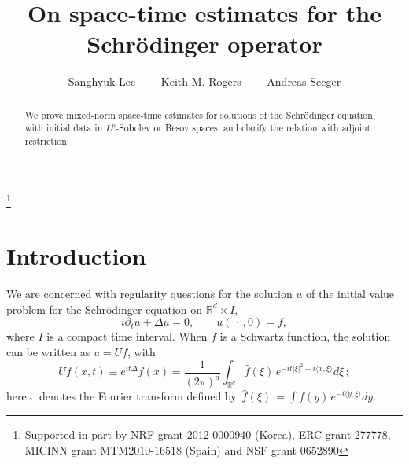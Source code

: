 \documentclass[11pt]{amsart}
\theoremstyle{definition}
\numberwithin{theorem}{section}
\numberwithin{definition}{section}
\numberwithin{equation}{section}
\def\inn#1#2{\langle#1,#2\rangle}
\def\inn#1#2{\langle#1,#2\rangle}
\def\bbR{{\mathbb {R}}}
\begin{document}
\newcommand{\w}{\widehat{f}}
\newcommand{\B}{\mathbb{B}}







\title[Space-time estimates for the Schr\"odinger operator]{On space-time
estimates for the Schr\"odinger operator}
\thanks{Supported in part by NRF grant 2012-0000940 (Korea),
ERC grant 277778, MICINN grant MTM2010-16518 (Spain) and NSF grant
0652890}

\author{Sanghyuk Lee \ \ \ \ Keith M. Rogers \ \ \ \ Andreas Seeger}



\address{Sanghyuk Lee\\ School of Mathematical Sciences,
Seoul National University, Seoul 151-742, Korea}

\address{Keith Rogers \\
Instituto de Ciencias Matematicas
CSIC-UAM-UC3M-UCM\\
28049 Madrid, Spain} 

\address{Andreas Seeger \\ Department of Mathematics \\ University of Wisconsin\\
480 Lincoln Drive\\
Madison, WI, 53706, USA} 



\begin{abstract}
We prove mixed-norm space-time estimates for solutions of the
Schr\"odinger equation, with initial data in $L^p$-Sobolev or  Besov
spaces,
and clarify the relation with adjoint restriction.
\end{abstract}



\maketitle


\section{Introduction}\label{intro}

We are concerned with regularity questions for
the solution $u$ of the initial value problem for the Schr\"odinger equation
on $\bbR^d\times I$,
$$i\partial_tu +\Delta u=0, \qquad u(\,\cdot\,,0)=f,$$
where  $I$ is  a compact time interval.  When $f$ is a Schwartz
function, the solution can be written as $u=Uf$, with
\begin{equation}\label{form}
Uf(x,t)\equiv e^{it\Delta}\! f(x) = \frac{1}{(2\pi)^{d}}
\int_{\mathbb{R}^d} \widehat
f(\xi)\,e^{-it |\xi|^2+i\inn x\xi
} d\xi\,;\end{equation} here $\,\widehat{\,}\,$ denotes the Fourier transform  defined by
$\,\widehat{f}(\xi)\,=\int f(y)\,e^{-i\inn y\xi}dy $.
\end{document}
